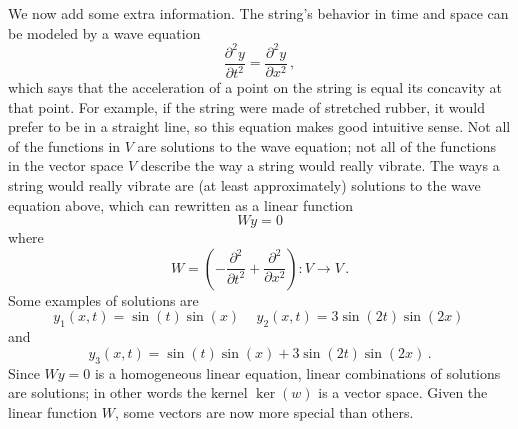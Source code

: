 \begin{example}
%
We now add some extra information.
The string's behavior in time and space can be modeled by a wave equation
\[\frac{\partial^2 y}{\partial t^2}=\frac{\partial^2 y}{\partial x^2}\, ,
\]
which says that the acceleration of a point on the string is equal its concavity at that point. For example, if the string were made of stretched rubber, it would 
prefer to be in a straight line, so this equation makes good intuitive sense. 
Not all of the functions in $V$ are solutions to the wave equation; not all of the functions in the vector space $V$ describe the way a string would really vibrate.  The ways a string  would really  vibrate are (at least approximately) solutions to the wave equation above, which can rewritten as a linear function
\[Wy=0\]
where
\[
W=\left(-\frac{\partial^2 }{\partial t^2}+\frac{\partial^2 }{\partial x^2}\right):V\rightarrow V\, .
\]
Some examples of solutions are 
\[
y_1(x,t)=\sin (t) \sin (x)\, \quad
y_2(x,t)=3\sin (2t) \sin (2x)\, \]
and
\[
y_3(x,t)=\sin (t) \sin (x)+3\sin (2t) \sin (2x)\, .
\]
Since $Wy=0$ is a homogeneous linear equation, linear combinations of solutions are solutions; in other words the kernel $\ker(w)$ is a vector space.
Given the linear function $W$, some vectors are now more special than others.


\end{example}
